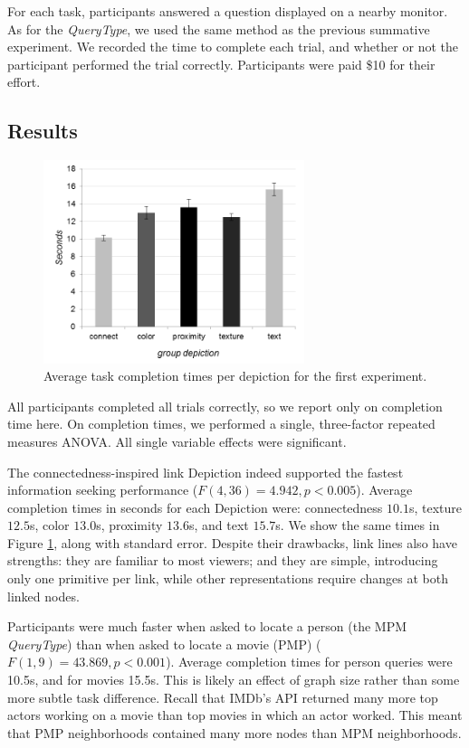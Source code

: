 \documentclass{sigchi}
\begin{document}
For each task, participants answered a question displayed on a nearby monitor. 
As for the \textit{QueryType}, we used the same method as the previous summative experiment.
We recorded the time to complete each trial, and whether or not the participant performed the trial correctly. Participants were paid \$10 for their effort.



\subsection{Results}
\begin{figure}[ht]
\centering
\includegraphics[width=3in]{images/depictiongraph}
\caption{Average task completion times per depiction for the first experiment.}
\label{fig:experiment1}
\end{figure}

All participants completed all trials correctly, so we report only on completion time here. On completion times, we performed a single, three-factor repeated measures ANOVA. All single variable effects were significant. 

The connectedness-inspired link Depiction indeed supported the fastest information seeking performance ($F(4,36)=4.942, p<0.005$). Average completion times in seconds for each Depiction were: connectedness $10.1$s, texture $12.5$s, color $13.0$s, proximity $13.6$s, and text $15.7$s. We show the same times in Figure \ref{fig:experiment1}, along with standard error. Despite their drawbacks, link lines also have strengths: they are familiar to most viewers;  and they are simple, introducing only one primitive per link, while other representations require changes at both linked nodes.


Participants were much faster when asked to locate a person (the MPM \textit{QueryType}) than when asked to locate a movie (PMP) ($F(1,9)=43.869, p<0.001$). Average completion times for person queries were 10.5s, and for movies 15.5s. This is likely an effect of graph size rather than some more subtle task difference. Recall that IMDb's API returned many more top actors working on a movie than top movies in which an actor worked. This meant that PMP neighborhoods contained many more nodes than MPM neighborhoods.
\end{document}
